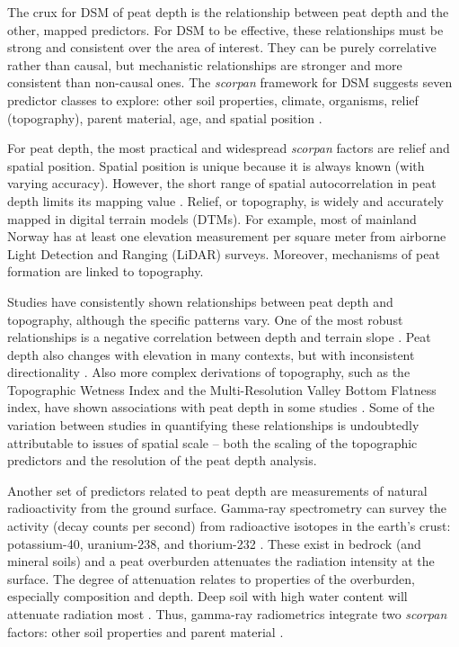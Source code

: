 \documentclass[soil, manuscript]{copernicus}
\begin{document}
The crux for DSM of peat depth is the relationship between peat depth and the other, mapped predictors.
For DSM to be effective, these relationships must be strong and consistent over the area of interest.
They can be purely correlative rather than causal, but mechanistic relationships are stronger and more consistent than non-causal ones.
The \emph{scorpan} framework for DSM suggests seven predictor classes to explore: other soil properties, climate, organisms, relief (topography), parent material, age, and spatial position \citep{mcbratneyDigitalSoilMapping2003}.

For peat depth, the most practical and widespread \emph{scorpan} factors are relief and spatial position.
Spatial position is unique because it is always known (with varying accuracy).
However, the short range of spatial autocorrelation in peat depth limits its mapping value \citep{henglGenericFrameworkSpatial2004}.
Relief, or topography, is widely and accurately mapped in digital terrain models (DTMs).
For example, most of mainland Norway has at least one elevation measurement per square meter from airborne Light Detection and Ranging (LiDAR) surveys.
Moreover, mechanisms of peat formation are linked to topography.

Studies have consistently shown relationships between peat depth and topography, although the specific patterns vary.
One of the most robust relationships is a negative correlation between depth and terrain slope \citep[e.g.][]{holdenEstimatingCarbonStock2011, parryMethodModellingPeat2012, gatisMappingUplandPeat2019}.
Peat depth also changes with elevation in many contexts, but with inconsistent directionality \citep[e.g.][]{holdenEstimatingCarbonStock2011, parryMethodModellingPeat2012, rudiyantoDigitalMappingCosteffective2016, rudiyantoOpenDigitalMapping2018, kogantiMappingPeatDepth2023, liFactorsControllingPeat2024}.
Also more complex derivations of topography, such as the Topographic Wetness Index and the Multi-Resolution Valley Bottom Flatness index, have shown associations with peat depth in some studies \citep[e.g.][]{rudiyantoOpenDigitalMapping2018, kogantiMappingPeatDepth2023, liFactorsControllingPeat2024}.
Some of the variation between studies in quantifying these relationships is undoubtedly attributable to issues of spatial scale -- both the scaling of the topographic predictors and the resolution of the peat depth analysis.

Another set of predictors related to peat depth are measurements of natural radioactivity from the ground surface.
Gamma-ray spectrometry can survey the activity (decay counts per second) from radioactive isotopes in the earth's crust: potassium-40, uranium-238, and thorium-232 \citep{reinhardtGammaraySpectrometryVersatile2019}.
These exist in bedrock (and mineral soils) and a peat overburden attenuates the radiation intensity at the surface.
The degree of attenuation relates to properties of the overburden, especially composition and depth.
Deep soil with high water content will attenuate radiation most \citep{beamishGammaRayAttenuation2013, reinhardtGammaraySpectrometryVersatile2019}.
Thus, gamma-ray radiometrics integrate two \emph{scorpan} factors: other soil properties and parent material \citep{mcbratneyDigitalSoilMapping2003}.
\end{document}

